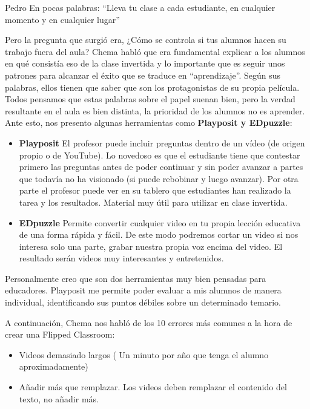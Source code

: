 \begin{opin}{\pedrocolor}{Pedro}
En pocas palabras: “Lleva tu clase a cada estudiante, en cualquier momento y en cualquier lugar”

Pero la pregunta que surgió era, ¿Cómo se controla si tus alumnos hacen su trabajo fuera del aula? Chema habló que era fundamental explicar a los alumnos en qué consistía eso de la clase invertida y lo importante que es seguir unos patrones  para alcanzar el éxito que se traduce en “aprendizaje”. Según sus palabras, ellos tienen que saber que son los protagonistas de su propia película. Todos pensamos que estas palabras sobre el papel suenan bien, pero la verdad resultante en el aula es bien distinta, la prioridad de los alumnos no es aprender. Ante esto, nos presento algunas herramientas como \textbf{Playposit y EDpuzzle}:

\begin{itemize}

\item  \textbf{Playposit} El profesor puede incluir preguntas dentro de un vídeo (de origen propio o de YouTube). Lo novedoso es que el estudiante tiene que contestar primero las preguntas antes de poder continuar y sin poder avanzar a partes que todavía no ha visionado (si puede rebobinar y luego avanzar). Por otra parte el profesor puede ver en su tablero que estudiantes han realizado la tarea y los resultados. Material muy útil para utilizar en clase invertida. 

\item  \textbf{EDpuzzle} Permite convertir cualquier video en tu propia lección educativa de una forma rápida y fácil. De este modo podremos cortar un video si nos interesa solo una parte, grabar nuestra propia voz encima del video.  El resultado serán videos muy interesantes y entretenidos. 
\end{itemize}

Personalmente creo que son dos herramientas muy bien pensadas para educadores. Playposit me permite poder evaluar a mis alumnos de manera individual, identificando sus puntos débiles sobre un determinado temario.

 
A continuación, Chema nos habló de los 10  errores más comunes a la hora de crear una Flipped Classroom:

\begin{itemize}

\item Videos demasiado largos ( Un minuto por año que tenga el alumno aproximadamente) 

\item Añadir más que remplazar. Los videos deben remplazar el contenido del texto, no añadir más. 


\end{itemize}
\end{opin}
